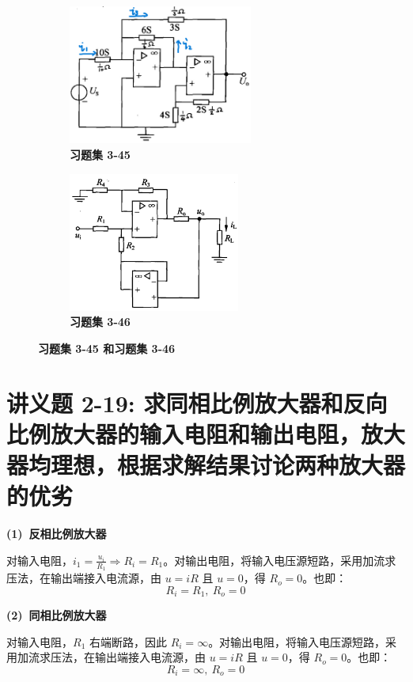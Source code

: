\documentclass[UTF8]{report}
\theoremstyle{MyLineTheoremStyle} %
\theoremstyle{MyBlockTheoremStyle} %
\theoremstyle{MySubsubsectionStyle} %
\begin{document}
\begin{figure}[H]\centering
    \begin{subfigure}[t]{0.43\textwidth}\centering
        \includegraphics[height=130pt]{assets/3/3-45.png}
        \caption{\bfseries 习题集 3-45 }
    \end{subfigure}\begin{subfigure}[t]{0.43\textwidth}\centering
        \includegraphics[height=130pt]{assets/3/3-46.png}
        \caption{\bfseries 习题集 3-46 }
    \end{subfigure}
    \caption{\bfseries 习题集 3-45 和习题集 3-46 }
    \end{figure}
    


\section{讲义题 2-19: 求同相比例放大器和反向比例放大器的输入电阻和输出电阻，放大器均理想，根据求解结果讨论两种放大器的优劣}
\textbf{(1)\ 反相比例放大器}

对输入电阻，$i_1 = \frac{u_i}{R_1} \Longrightarrow R_i = R_1$。对输出电阻，将输入电压源短路，采用加流求压法，在输出端接入电流源，由 $u = iR$ 且 $u=0$，得 $R_o = 0$。也即：
\begin{equation}
R_i = R_1,\ R_o = 0
\end{equation}

\textbf{(2)\ 同相比例放大器}

对输入电阻，$R_1$ 右端断路，因此 $R_i = \infty$。对输出电阻，将输入电压源短路，采用加流求压法，在输出端接入电流源，由 $u = iR$ 且 $u=0$，得 $R_o = 0$。也即：
\begin{equation}
R_i = \infty,\ R_o = 0
\end{equation}
\end{document}
